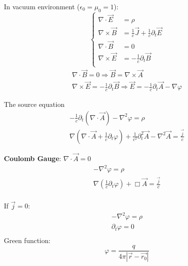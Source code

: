 In vacuum environment ($\epsilon_0 = \mu_0  = 1$):
\begin{equation}
    \label{eqn:Maxwell_vacuum}
    \left\{
    \begin{aligned}
	\nabla\cdot{\vec{E}} &= \rho	\\
	\nabla\times{\vec{B}} &= \frac{1}{c}\vec{J} +\frac{1}{c}\partial_{t}\vec{E}    \\
	\nabla\cdot{\vec{B}} &= 0  \\
	\nabla\times{\vec{E}} &= -\frac{1}{c}\partial_{t}\vec{B}	\\
    \end{aligned}
    \right.
\end{equation}
\begin{equation*}
    \begin{gathered}
	\nabla\cdot\vec{B} = 0 \Rightarrow \vec{B} = \nabla\times\vec{A}    \\
	\nabla\times\vec{E} = -\frac{1}{c}\partial_t\vec{B} \Rightarrow \vec{E} = -\frac{1}{c}\partial_t\vec{A} - \nabla\varphi
    \end{gathered}
\end{equation*}

The source equation
\begin{equation*}
    \begin{gathered}
	-\frac{1}{c}\partial_t(\nabla\cdot\vec{A}) - \nabla^2\varphi = \rho    \\
	\nabla(\nabla\cdot\vec{A} + \frac{1}{c}\partial_t\varphi) + \frac{1}{c^2}\partial^2_t\vec{A} - \nabla^2\vec{A} = \frac{\vec{j}}{c}
    \end{gathered}
\end{equation*}

\textbf{Coulomb Gauge}:	$\nabla\cdot\vec{A} = 0$
\begin{equation*}
    \begin{gathered}
	-\nabla^2\varphi = \rho	\\
	\nabla(\frac{1}{c}\partial_t\varphi) + \Box\vec{A} = \frac{\vec{j}}{c}	\\
    \end{gathered}
\end{equation*}

\indent If $\vec{j} = 0$: 
\begin{equation*}
    \begin{gathered}
	-\nabla^2\varphi = \rho	\\
	\partial_t\varphi = 0	\\
    \end{gathered}
\end{equation*}
Green function:
\begin{equation*}
    \varphi = \frac{q}{4\pi|\vec{r} - \vec{r_0}|}
\end{equation*}

